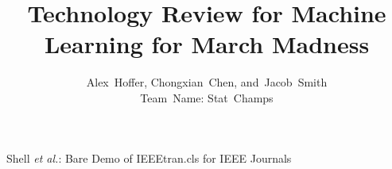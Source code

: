 \documentclass[journal,onecolumn]{IEEEtran}
\begin{document}
%
\title{Technology Review for Machine Learning for March Madness}
%
%
%

\author{Alex~Hoffer,
        Chongxian~Chen,
        and~Jacob~Smith\\Team~Name: Stat~Champs}%


% 
%



%
{Shell \MakeLowercase{\textit{et al.}}: Bare Demo of IEEEtran.cls for IEEE Journals}
% 
\end{document}
